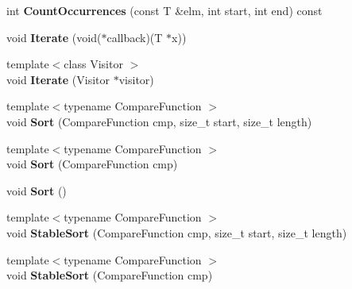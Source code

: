 \begin{DoxyCompactItemize}
\item 
int {\bfseries Count\+Occurrences} (const T \&elm, int start, int end) const \hypertarget{classv8_1_1internal_1_1_list_a6ea372eb008b89abd2b9f71ca7f7a17d}{}\label{classv8_1_1internal_1_1_list_a6ea372eb008b89abd2b9f71ca7f7a17d}

\item 
void {\bfseries Iterate} (void($\ast$callback)(T $\ast$x))\hypertarget{classv8_1_1internal_1_1_list_a6f1953357c2a1d4a562b522bbfa25e08}{}\label{classv8_1_1internal_1_1_list_a6f1953357c2a1d4a562b522bbfa25e08}

\item 
{\footnotesize template$<$class Visitor $>$ }\\void {\bfseries Iterate} (Visitor $\ast$visitor)\hypertarget{classv8_1_1internal_1_1_list_aabc219bc26a394d0a821b95474c33694}{}\label{classv8_1_1internal_1_1_list_aabc219bc26a394d0a821b95474c33694}

\item 
{\footnotesize template$<$typename Compare\+Function $>$ }\\void {\bfseries Sort} (Compare\+Function cmp, size\+\_\+t start, size\+\_\+t length)\hypertarget{classv8_1_1internal_1_1_list_a86adfcd83baf6c5913ac15226941614e}{}\label{classv8_1_1internal_1_1_list_a86adfcd83baf6c5913ac15226941614e}

\item 
{\footnotesize template$<$typename Compare\+Function $>$ }\\void {\bfseries Sort} (Compare\+Function cmp)\hypertarget{classv8_1_1internal_1_1_list_ac63bd727ba63ab11e69561f22310f348}{}\label{classv8_1_1internal_1_1_list_ac63bd727ba63ab11e69561f22310f348}

\item 
void {\bfseries Sort} ()\hypertarget{classv8_1_1internal_1_1_list_ac4f0b816ee55aeccd8f9cba78540a79e}{}\label{classv8_1_1internal_1_1_list_ac4f0b816ee55aeccd8f9cba78540a79e}

\item 
{\footnotesize template$<$typename Compare\+Function $>$ }\\void {\bfseries Stable\+Sort} (Compare\+Function cmp, size\+\_\+t start, size\+\_\+t length)\hypertarget{classv8_1_1internal_1_1_list_a6fc78b5209dc4fb4e8b00eb16787e5f1}{}\label{classv8_1_1internal_1_1_list_a6fc78b5209dc4fb4e8b00eb16787e5f1}

\item 
{\footnotesize template$<$typename Compare\+Function $>$ }\\void {\bfseries Stable\+Sort} (Compare\+Function cmp)\hypertarget{classv8_1_1internal_1_1_list_a953dd0453dbeba9cec48709fd438a2e4}{}\label{classv8_1_1internal_1_1_list_a953dd0453dbeba9cec48709fd438a2e4}


\end{DoxyCompactItemize}
